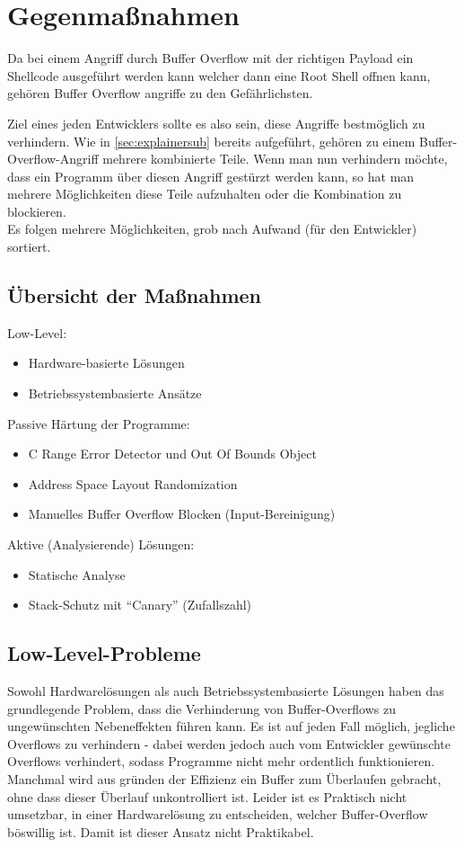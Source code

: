 \pagebreak
\section{Gegenmaßnahmen}
Da bei einem Angriff durch Buffer Overflow mit der richtigen Payload
ein Shellcode ausgeführt werden kann welcher dann eine Root Shell
offnen kann, gehören
Buffer Overflow angriffe zu den Gefährlichsten.

Ziel eines jeden Entwicklers sollte es also sein, diese Angriffe bestmöglich
zu verhindern.
Wie in \autoref{sec:explainersub} bereits aufgeführt,
gehören zu einem Buffer-Overflow-Angriff mehrere kombinierte Teile. Wenn
man nun verhindern möchte, dass ein Programm über diesen Angriff gestürzt werden
kann, so hat man mehrere Möglichkeiten diese Teile aufzuhalten oder die Kombination
zu blockieren. \cite{Werthmann2006SurveyOB}\\
Es folgen mehrere Möglichkeiten, grob nach Aufwand (für den Entwickler) sortiert.
\subsection{Übersicht der Maßnahmen}
Low-Level:
\begin{itemize}
    \item Hardware-basierte Lösungen
    \item Betriebssystembasierte Ansätze
\end{itemize}
Passive Härtung der Programme:
\begin{itemize}
    \item C Range Error Detector und Out Of Bounds Object
    \item Address Space Layout Randomization
    \item Manuelles Buffer Overflow Blocken (Input-Bereinigung)
\end{itemize}
Aktive (Analysierende) Lösungen:
\begin{itemize}
    \item Statische Analyse
    \item Stack-Schutz mit ``Canary'' (Zufallszahl)
\end{itemize}

\subsection{Low-Level-Probleme}
Sowohl Hardwarelösungen als auch Betriebssystembasierte Lösungen haben
das grundlegende Problem, dass die Verhinderung von Buffer-Overflows zu
ungewünschten Nebeneffekten führen kann. Es ist auf jeden Fall möglich,
jegliche Overflows zu verhindern - dabei werden jedoch auch vom
Entwickler gewünschte Overflows verhindert, sodass Programme nicht mehr
ordentlich funktionieren. Manchmal wird aus gründen der Effizienz ein
Buffer zum Überlaufen gebracht, ohne dass dieser Überlauf unkontrolliert
ist. Leider ist es Praktisch nicht umsetzbar, in einer Hardwarelösung
zu entscheiden, welcher Buffer-Overflow böswillig ist. Damit ist dieser Ansatz
nicht Praktikabel.

